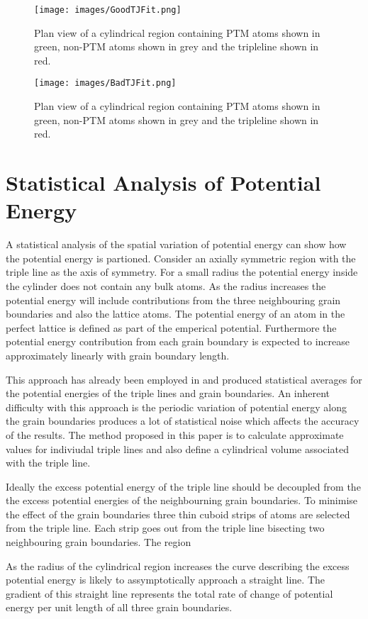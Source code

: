 \documentclass[12pt,a4paper]{book}
\begin{document}
\begin{figure}
	\texttt{[image: images/GoodTJFit.png]} 
	\caption{Plan view of a cylindrical region containing PTM atoms shown in green, non-PTM atoms shown in grey and the tripleline shown in red.}
\end{figure}
\begin{figure}
	\texttt{[image: images/BadTJFit.png]} 
	\caption{Plan view of a cylindrical region containing PTM atoms shown in green, non-PTM atoms shown in grey and the tripleline shown in red.}
\end{figure}
\section{Statistical Analysis of Potential Energy}

A statistical analysis of the spatial variation of potential energy can show how the potential energy is partioned. Consider an axially symmetric region with the triple line as the axis of symmetry. For a small radius the potential energy inside the cylinder does not contain any bulk atoms. As the radius increases the potential energy will include contributions from the three neighbouring grain boundaries and also the lattice atoms. The potential energy of an atom in the perfect lattice is defined as part of the emperical potential. Furthermore the potential energy contribution from each grain boundary is expected to increase approximately linearly with grain boundary length.

This approach has already been employed in \citep{Srinivasan1999}   
and produced statistical averages for the potential energies of the triple lines and grain boundaries. An inherent difficulty with this approach is the periodic variation of potential energy along the grain boundaries produces a lot of statistical noise which affects the accuracy of the results. The method proposed in this paper is to calculate approximate values for indiviudal triple lines and also define a cylindrical volume associated with the triple line.

Ideally the excess potential energy of the triple line should be decoupled from the the excess potential energies of the neighbourning grain boundaries. To minimise the effect of the grain boundaries three thin cuboid strips of atoms are selected from the triple line. Each strip goes out from the triple line bisecting two neighbouring grain boundaries. The region  


As the radius of the cylindrical region increases the curve describing the excess potential energy is likely to assymptotically approach a straight line. The gradient of this straight line represents the total rate of change of potential energy per unit length of all three grain boundaries. 
\end{document}
